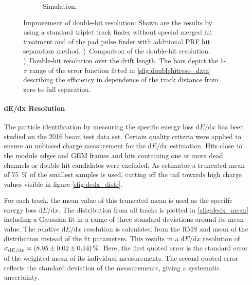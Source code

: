 \begin{figure}[tbhp!]
\begin{subfigure}[b]{0.5\textwidth}
\caption{Simulation.}
\label{sfig:DHR_vs_drift_data}
\end{subfigure}
\caption{\small Improvement of double-hit resolution: Shown are the results by using a standard triplet track finder without special merged hit treatment and of the pad pulse finder with additional PRF hit separation method. 
\protect{})~Comparison of the double-hit resolution.
\protect{})~Double-hit resolution over the drift length. The bars depict the 1-$\mathrm{\sigma}$ range of the error function fitted in \protect\ref{sfig:doublehitreso_data} describing the efficiency in dependence of the track distance from zero to full separation.
}
\label{fig:doublehitreso}
\end{figure}

\paragraph{dE/dx Resolution}

The particle identification by measuring the specific energy loss \ensuremath{\mathrm{d}E/\mathrm{d}x} has been studied on the 2016 beam test data set. 
Certain quality criteria were applied to ensure an unbiased charge measurement for the \ensuremath{\mathrm{d}E/\mathrm{d}x} estimation.
Hits close to the module edges and GEM frames and hits containing one or more dead channels or double-hit candidates were excluded.
As estimator a truncated mean of \SI{75}{\percent} of the smallest samples is used, cutting off the tail towards high charge values visible in figure \ref{sfig:dedx_distr}.

For each track, the mean value of this truncated mean is used as the specific energy loss \ensuremath{\mathrm{d}E/\mathrm{d}x}.
The distribution from all tracks is plotted in \ref{sfig:dedx_mean} including a Gaussian fit in a range of three standard deviations around its mean value.
The relative \ensuremath{\mathrm{d}E/\mathrm{d}x} resolution is calculated from the RMS and mean of the distribution instead of the fit parameters.
This results in a \ensuremath{\mathrm{d}E/\mathrm{d}x} resolution of $\sigma_{\mathrm{d}E/\mathrm{d}x} = \SI[parse-numbers=false]{(8.95\pm0.02\pm0.14)}{\percent}$. 
Here, the first quoted error is the standard error of the weighted mean of its individual measurements.
The second quoted error reflects the standard deviation of the measurements, giving a systematic uncertainty.

